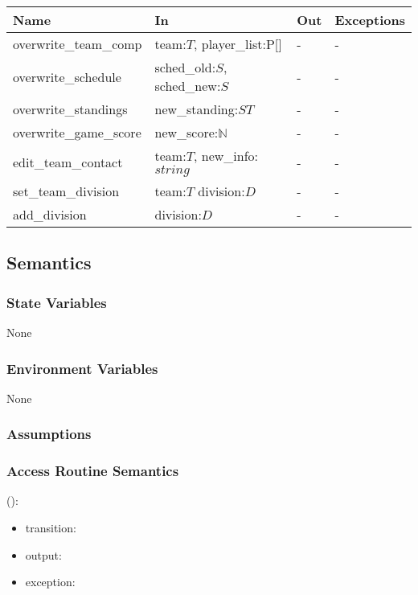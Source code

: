 \documentclass[12pt, titlepage]{article}
\begin{document}
\begin{center}
\begin{tabular}{p{5cm} p{4cm} p{4cm} p{2cm}}
\hline
\textbf{Name} & \textbf{In} & \textbf{Out} & \textbf{Exceptions} \\
\hline
overwrite\_team\_comp & team:$T$, player\_list:P[] & - & - \\
overwrite\_schedule & sched\_old:$S$, sched\_new:$S$ & - & - \\
overwrite\_standings & new\_standing:$ST$ & - & - \\
overwrite\_game\_score & new\_score:$\mathbb{N}$ & - & - \\
edit\_team\_contact & team:$T$, new\_info:$string$ & - & - \\
set\_team\_division & team:$T$ division:$D$ & - & - \\
add\_division & division:$D$ & - & - \\

\hline
\end{tabular}
\end{center}

\subsection{Semantics}

\subsubsection{State Variables}

None

\subsubsection{Environment Variables}

None

\subsubsection{Assumptions}


\subsubsection{Access Routine Semantics}

\noindent {}():
\begin{itemize}
\item transition:  
\item output:  
\item exception:  
\end{itemize}
\end{document}

